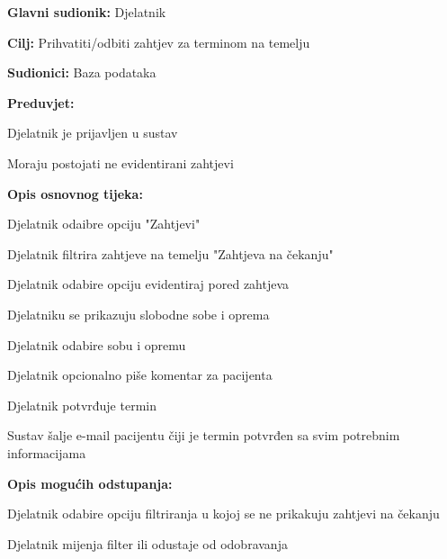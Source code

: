 				\noindent {}
				\begin{packed_item}
					
					\item \textbf{Glavni sudionik: }Djelatnik
					\item  \textbf{Cilj: }Prihvatiti/odbiti zahtjev za terminom na temelju 
					\item  \textbf{Sudionici: }Baza podataka
					\item  \textbf{Preduvjet: }
					\item[] \begin{packed_enum}
						
						\item[-] Djelatnik je prijavljen u sustav
						\item[-] Moraju postojati ne evidentirani zahtjevi
					\end{packed_enum}
					\item  \textbf{Opis osnovnog tijeka: }
					
					\item[] \begin{packed_enum}
						\item Djelatnik odaibre opciju "Zahtjevi"
						\item Djelatnik filtrira zahtjeve na temelju "Zahtjeva na čekanju"
						\item Djelatnik odabire opciju evidentiraj pored zahtjeva 
						\item Djelatniku se prikazuju slobodne sobe i oprema 
						\item Djelatnik odabire sobu i opremu 
						\item Djelatnik opcionalno piše komentar za pacijenta
						\item Djelatnik potvrđuje termin
						\item Sustav šalje e-mail pacijentu čiji je termin potvrđen sa svim potrebnim informacijama
					\end{packed_enum}
					
					\item  \textbf{Opis mogućih odstupanja:}
					
					\item[] \begin{packed_item}
						
						\item[2.a] Djelatnik odabire opciju filtriranja u kojoj se ne prikakuju zahtjevi na čekanju
						\item[] \begin{packed_enum}
							\item Djelatnik mijenja filter ili odustaje od odobravanja
							

\end{packed_enum}
\end{packed_item}
\end{packed_item}
